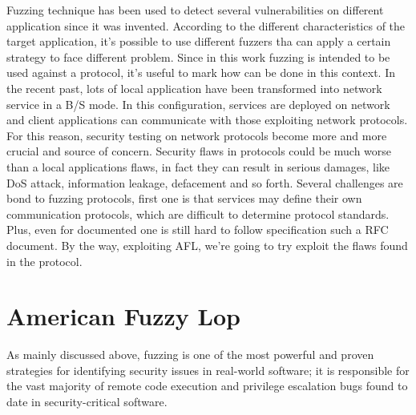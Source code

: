Fuzzing technique has been used to detect several vulnerabilities on different application since it was invented. 
According to the different characteristics of the target application, it's possible to use different fuzzers tha can apply a certain strategy to face different problem.
Since in this work fuzzing is intended to be used against a protocol, it's useful to mark how can be done in this context.
In the recent past, lots of local application have been transformed into network service in a B/S mode. In this configuration, services are deployed on network and client applications can communicate with those exploiting network protocols.
For this reason, security testing on network protocols become more and more crucial and source of concern. Security flaws in protocols could be much worse than a local applications flaws, in fact they can result in serious damages, like DoS attack, information leakage, defacement and so forth.
Several challenges are bond to fuzzing protocols, first one is that services may define their own communication protocols, which are difficult to determine protocol standards. Plus, even for documented one is still hard to follow specification such a RFC document.
By the way, exploiting AFL, we're going to try exploit the flaws found in the \fwh protocol. \cite{LiJun2018Fas}



\section{American Fuzzy Lop}

As mainly discussed above, fuzzing is one of the most powerful and proven strategies for identifying
security issues in real-world software; it is responsible for the vast majority of remote code execution and privilege escalation bugs found to date in security-critical software.



